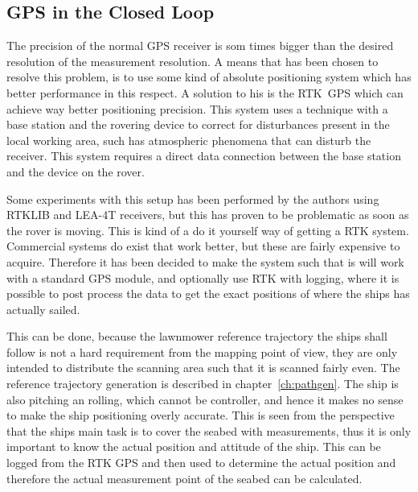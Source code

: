 \subsection{GPS in the Closed Loop}

The precision of the normal \ac{GPS} receiver is som times bigger than the desired resolution of the measurement resolution. A means that has been chosen to resolve this problem, is to use some kind of absolute positioning system which has better performance in this respect. A solution to his is the \ac{RTK}\ \ac{GPS} which can achieve way better positioning precision. This system uses a technique with a base station and the rovering device to correct for disturbances present in the local working area, such has atmospheric phenomena that can disturb the receiver. This system requires a direct data connection between the base station and the device on the rover.

Some experiments with this setup has been performed by the authors
using RTKLIB and LEA-4T receivers, but this has proven to be
problematic as soon as the rover is moving. This is kind of a do it
yourself way of getting a \ac{RTK} system. Commercial systems do exist
that work better, but these are fairly expensive to acquire. Therefore
it has been decided to make the system such that is will work with a
standard \ac{GPS} module, and optionally use \ac{RTK} with logging,
where it is possible to post process the data to get the exact
positions of where the ships has actually sailed.

This can be done, because the lawnmower reference trajectory the ships
shall follow is not a hard requirement from the mapping point of view,
they are only intended to distribute the scanning area such that it is
scanned fairly even. The reference trajectory generation is described
in chapter~\vref{ch:pathgen}. The ship is also pitching an rolling,
which cannot be controller, and hence it makes no sense to make the
ship positioning overly accurate. This is seen from the perspective
that the ships main task is to cover the seabed with measurements,
thus it is only important to know the actual position and attitude of
the ship. This can be logged from the \ac{RTK} \ac{GPS} and then used
to determine the actual position and therefore the actual measurement
point of the seabed can be calculated.

